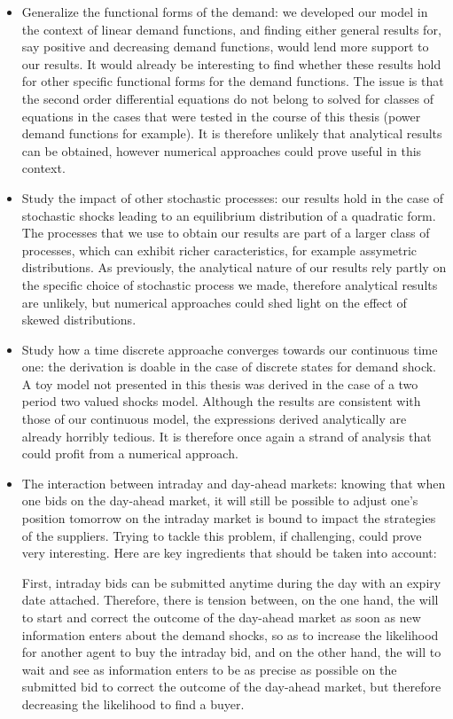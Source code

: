 \begin{itemize}
\item Generalize the functional forms of the demand: we developed our model in the context of linear demand functions, and finding either general results for, say positive and decreasing demand functions, would lend more support to our results. It would already be interesting to find whether these results hold for other specific functional forms for the demand functions. The issue is that the second order differential equations do not belong to solved for classes of equations in the cases that were tested in the course of this thesis (power demand functions for example). It is therefore unlikely that analytical results can be obtained, however numerical approaches could prove useful in this context. 

\item Study the impact of other stochastic processes: our results hold in the case of stochastic shocks leading to an equilibrium distribution of a quadratic form. The processes that we use to obtain our results are part of a larger class of processes, which can exhibit richer caracteristics, for example assymetric distributions. As previously, the analytical nature of our results rely partly on the specific choice of stochastic process we made, therefore analytical results are unlikely, but numerical approaches could shed light on the effect of skewed distributions.

\item Study how a time discrete approache converges towards our continuous time one: the derivation is doable in the case of discrete states for demand shock. A toy model not presented in this thesis was derived in the case of a two period two valued shocks model. Although the results are consistent with those of our continuous model, the expressions derived analytically are already horribly tedious. It is therefore once again a strand of analysis that could profit from a numerical approach.

\item The interaction between intraday and day-ahead markets: knowing that when one bids on the day-ahead market, it will still be possible to adjust one's position tomorrow on the intraday market is bound to impact the strategies of the suppliers. Trying to tackle this problem, if challenging, could prove very interesting. Here are key ingredients that should be taken into account: 

First, intraday bids can be submitted anytime during the day with an expiry date attached. Therefore, there is tension between, on the one hand, the will to start and correct the outcome of the day-ahead market as soon as new information enters about the demand shocks, so as to increase the likelihood for another agent to buy the intraday bid, and on the other hand, the will to wait and see as information enters to be as precise as possible on the submitted bid to correct the outcome of the day-ahead market, but therefore decreasing the likelihood to find a buyer. 


\end{itemize}
